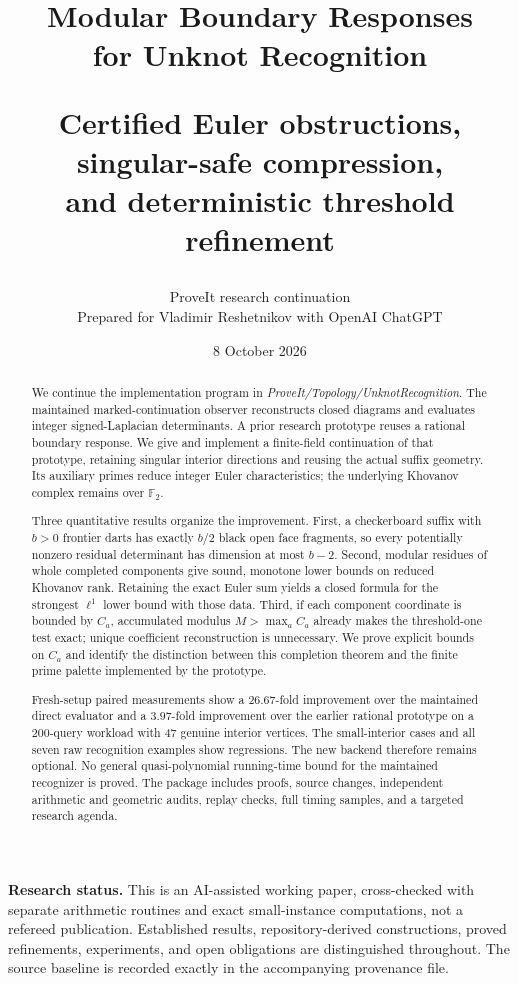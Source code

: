 \documentclass[11pt]{article}
\title{\color{ink}\bfseries Modular Boundary Responses\\for Unknot Recognition\par
 \vspace{0.5em}\large Certified Euler obstructions, singular-safe compression,\\
 and deterministic threshold refinement}
\author{ProveIt research continuation\\
 \small Prepared for Vladimir Reshetnikov with OpenAI ChatGPT}
\date{8 October 2026}
\theoremstyle{definition}
\theoremstyle{remark}
\newcommand{\F}{\mathbb F}
\begin{document}
\maketitle
\thispagestyle{empty}
\begin{abstract}
We continue the implementation program in \emph{ProveIt/Topology/UnknotRecognition}.
The maintained marked-continuation observer reconstructs closed diagrams and
evaluates integer signed-Laplacian determinants. A prior research prototype
reuses a rational boundary response. We give and implement a finite-field
continuation of that prototype, retaining singular interior directions and
reusing the actual suffix geometry. Its auxiliary primes reduce integer Euler
characteristics; the underlying Khovanov complex remains over $\F_2$.

Three quantitative results organize the improvement. First, a checkerboard
suffix with $b>0$ frontier darts has exactly $b/2$ black open face fragments,
so every potentially nonzero residual determinant has dimension at most $b-2$.
Second, modular residues of whole completed components give sound, monotone
lower bounds on reduced Khovanov rank. Retaining the exact Euler sum yields a
closed formula for the strongest $\ell^1$ lower bound with those data.
Third, if each component coordinate is bounded by $C_a$, accumulated modulus
$M>\max_a C_a$ already makes the threshold-one test exact; unique coefficient
reconstruction is unnecessary. We prove explicit bounds on $C_a$ and identify
the distinction between this completion theorem and the finite prime palette
implemented by the prototype.

Fresh-setup paired measurements show a $26.67$-fold improvement over the
maintained direct evaluator and a $3.97$-fold improvement over the earlier
rational prototype on a 200-query workload with 47 genuine interior vertices.
The small-interior cases and all seven raw recognition examples show regressions.
The new backend therefore remains optional. No general quasi-polynomial
running-time bound for the maintained recognizer is proved. The package
includes proofs, source changes, independent arithmetic and geometric audits,
replay checks, full timing samples, and a targeted research agenda.
\end{abstract}
\vfill
\noindent\small\textbf{Research status.} This is an AI-assisted working paper, cross-checked with separate
arithmetic routines and exact small-instance computations, not a refereed publication. Established results,
repository-derived constructions, proved refinements, experiments, and open
obligations are distinguished throughout. The source baseline is recorded
exactly in the accompanying provenance file.
\newpage
{\small\setlength{\parskip}{0pt}\tableofcontents}
\newpage









\end{document}
